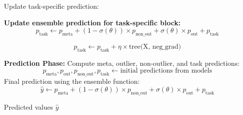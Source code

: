 \documentclass{article}
\begin{document}
\begin{algorithm}
\begin{algorithmic}[1]
        \ELSE
        \STATE Update task-specific prediction:

        \STATE \textbf{Update ensemble prediction for task-specific block:}
        \[
            p_{\text{task}} \gets p_{\text{meta}} + (1 - \sigma(\theta)) \times p_{\text{non\_out}} + \sigma(\theta) \times p_{\text{out}} + p_{\text{task}}
        \]

        \[
            p_{\text{task}} \gets p_{\text{task}} + \eta \times \text{tree(X, neg\_grad)}
        \]
        \ENDIF
        \ENDFOR

        \STATE \textbf{Prediction Phase:}
        \STATE Compute meta, outlier, non-outlier, and task predictions:
        \[
            p_{\text{meta}}, p_{\text{out}}, p_{\text{non\_out}}, p_{\text{task}} \gets \text{initial predictions from models}
        \]
        \STATE Final prediction using the ensemble function:
        \[
            \hat{y} \gets p_{\text{meta}} + (1 - \sigma(\theta)) \times p_{\text{non\_out}} + \sigma(\theta) \times p_{\text{out}} + p_{\text{task}}
        \]

        \RETURN Predicted values $\hat{y}$

    \end{algorithmic}
\end{algorithm}
\end{document}
